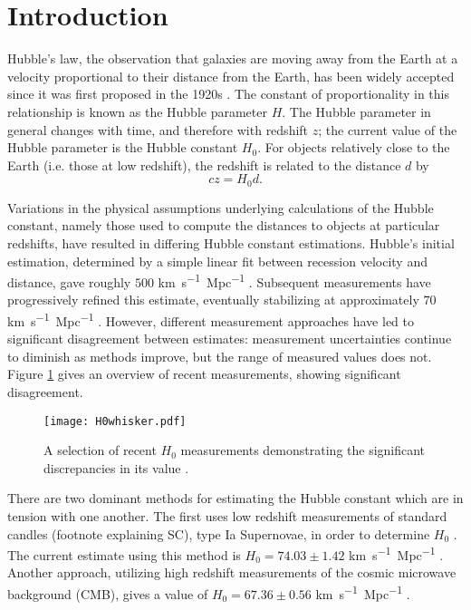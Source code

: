 \section{\label{sec:intro} Introduction}

Hubble's law, the observation that galaxies are moving away from the Earth at a velocity proportional to their distance from the Earth, has been widely accepted since it was first proposed in the 1920s \cite{Hubble_1929}.
The constant of proportionality in this relationship is known as the Hubble parameter $H$.
The Hubble parameter in general changes with time, and therefore with redshift $z$; the current value of the Hubble parameter is the Hubble constant $H_0$.
For objects relatively close to the Earth (i.e. those at low redshift), the redshift is related to the distance $d$ by \cite{Freedman_2010}
\[
    c z = H_0 d.
\]

Variations in the physical assumptions underlying calculations of the Hubble constant, namely those used to compute the distances to objects at particular redshifts, have resulted in differing Hubble constant estimations.
Hubble’s initial estimation, determined by a simple linear fit between recession velocity and distance, gave roughly $500$ \si{km.s^{-1}.Mpc^{-1}} \cite{Hubble_1929}.
Subsequent measurements have progressively refined this estimate, eventually stabilizing at approximately $70$ \si{km.s^{-1}.Mpc^{-1}} \cite{Freedman_2010}.
However, different measurement approaches have led to significant disagreement between estimates: measurement uncertainties continue to diminish as methods improve, but the range of measured values does not.
Figure \ref{fig:hist_h0} gives an overview of recent measurements, showing significant disagreement.

\begin{figure}
    \centering
    \texttt{[image: H0whisker.pdf]}
    \caption{A selection of recent $H_0$ measurements demonstrating the significant discrepancies in its value \cite{Pogosian_2020, Planck_2020, Aiola_2020, WMAP_2018, Henning_2018, Planck_2016, Hinshaw_2013, Freedman_2001, Freedman_2012, Riess_2016, Feeney_2018, Burns_2018,  Riess_2019, Camarena_2020, Riess_2021, Breuval_2021}.}
    \label{fig:hist_h0}
\end{figure}

There are two dominant methods for estimating the Hubble constant which are in tension with one another.
The first uses low redshift measurements of standard candles (footnote explaining SC), type Ia Supernovae, in order to determine $H_0$ .
The current estimate using this method is $H_0 = 74.03 \pm 1.42$ \si{km.s^{-1}.Mpc^{-1}} \cite{Riess_2019}.
Another approach, utilizing high redshift measurements of the cosmic microwave background (CMB), gives a value of $H_0 = 67.36 \pm 0.56$ \si{km.s^{-1}.Mpc^{-1}} \cite{Planck_2020}.

